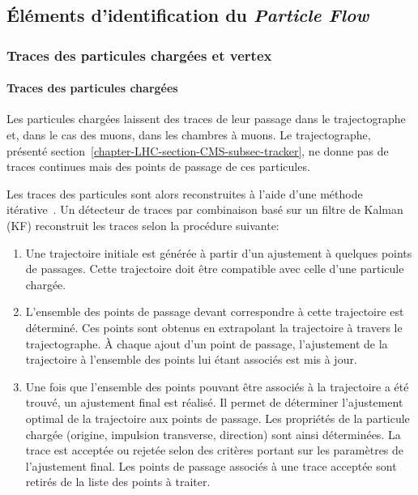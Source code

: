 \subsection{Éléments d'identification du \emph{Particle Flow}}\label{chapter-LHC-section-evt_reco-subsec-PF_elements}
\subsubsection{Traces des particules chargées et vertex}\label{chapter-LHC-section-evt_reco-subsec-PF_elements-subsubsec-tracks}
\paragraph{Traces des particules chargées}
Les particules chargées laissent des traces de leur passage dans le trajectographe et, dans le cas des muons, dans les chambres à muons.
Le trajectographe, présenté section~\ref{chapter-LHC-section-CMS-subsec-tracker}, ne donne pas de traces continues mais des points de passage de ces particules.
\par
Les traces des particules sont alors reconstruites
à l'aide d'une méthode itérative~\cite{particle-flow,track_reco}.
Un détecteur de traces par combinaison basé sur un filtre de Kalman (KF) \cite{Kalman_filter} reconstruit les traces selon la procédure suivante:
\begin{enumerate}
\item Une trajectoire initiale est générée à partir d'un ajustement à quelques points de passages.
Cette trajectoire doit être compatible avec celle d'une particule chargée.
\item L'ensemble des points de passage devant correspondre à cette trajectoire est déterminé.
Ces points sont obtenus en extrapolant la trajectoire à travers le trajectographe.
À chaque ajout d'un point de passage, l'ajustement de la trajectoire à l'ensemble des points lui étant associés est mis à jour.
\item Une fois que l'ensemble des points pouvant être associés à la trajectoire a été trouvé, un ajustement final est réalisé.
Il permet de déterminer l'ajustement optimal de la trajectoire aux points de passage.
Les propriétés de la particule chargée (origine, impulsion transverse, direction) sont ainsi déterminées.
La trace est acceptée ou rejetée selon des critères portant sur les paramètres de l'ajustement final.
Les points de passage associés à une trace acceptée sont retirés de la liste des points à traiter.
\end{enumerate}
